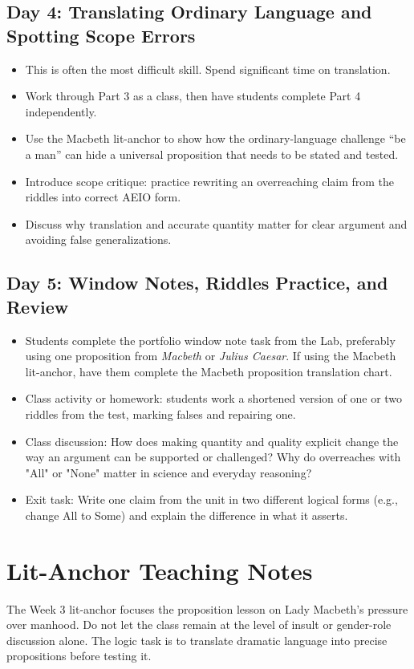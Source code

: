 \documentclass[12pt]{article}
\begin{document}
\subsection*{Day 4: Translating Ordinary Language and Spotting Scope Errors}
\begin{itemize}[leftmargin=*]
\item This is often the most difficult skill. Spend significant time on translation.
\item Work through Part 3 as a class, then have students complete Part 4 independently.
\item Use the Macbeth lit-anchor to show how the ordinary-language challenge ``be a man'' can hide a universal proposition that needs to be stated and tested.
\item Introduce scope critique: practice rewriting an overreaching claim from the riddles into correct AEIO form.
\item Discuss why translation and accurate quantity matter for clear argument and avoiding false generalizations.
\end{itemize}

\subsection*{Day 5: Window Notes, Riddles Practice, and Review}
\begin{itemize}[leftmargin=*]
\item Students complete the portfolio window note task from the Lab, preferably using one proposition from \textit{Macbeth} or \textit{Julius Caesar}. If using the Macbeth lit-anchor, have them complete the Macbeth proposition translation chart.
\item Class activity or homework: students work a shortened version of one or two riddles from the test, marking falses and repairing one.
\item Class discussion: How does making quantity and quality explicit change the way an argument can be supported or challenged? Why do overreaches with "All" or "None" matter in science and everyday reasoning?
\item Exit task: Write one claim from the unit in two different logical forms (e.g., change All to Some) and explain the difference in what it asserts.
\end{itemize}

\section*{Lit-Anchor Teaching Notes}
The Week 3 lit-anchor focuses the proposition lesson on Lady Macbeth's pressure over manhood. Do not let the class remain at the level of insult or gender-role discussion alone. The logic task is to translate dramatic language into precise propositions before testing it.
\end{document}
